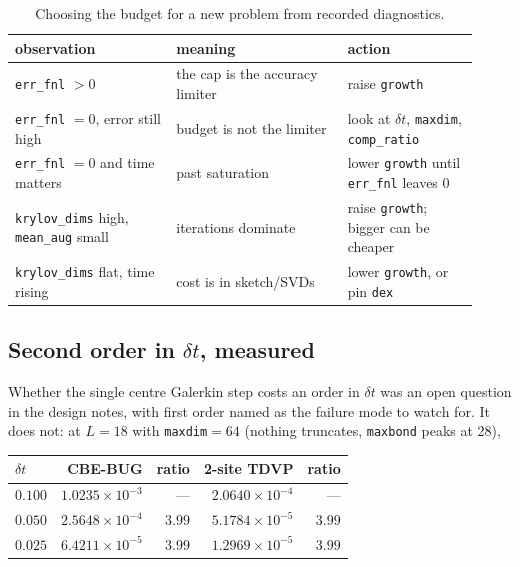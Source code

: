 \documentclass[11pt,a4paper]{article}
\newcommand{\code}[1]{\texttt{\small #1}}
\begin{document}
\begin{table}[t]
\centering
\begin{tabular}{@{}p{0.32\linewidth}p{0.34\linewidth}p{0.26\linewidth}@{}}
\toprule
\textbf{observation} & \textbf{meaning} & \textbf{action} \\
\midrule
\code{err\_fnl} $>0$ & the cap is the accuracy limiter & raise \code{growth} \\
\code{err\_fnl} $=0$, error still high & budget is not the limiter & look at $\delta t$,
\code{maxdim}, \code{comp\_ratio} \\
\code{err\_fnl} $=0$ and time matters & past saturation & lower \code{growth} until
\code{err\_fnl} leaves $0$ \\
\code{krylov\_dims} high, \code{mean\_aug} small & iterations dominate & raise \code{growth};
bigger can be cheaper \\
\code{krylov\_dims} flat, time rising & cost is in sketch/SVDs & lower \code{growth}, or pin
\code{dex} \\
\bottomrule
\end{tabular}
\caption{Choosing the budget for a new problem from recorded diagnostics.}
\label{tab:decide}
\end{table}

\subsection{Second order in \texorpdfstring{$\delta t$}{dt}, measured}

Whether the single centre Galerkin step costs an order in $\delta t$ was an open question in
the design notes, with first order named as the failure mode to watch for. It does not:
at $L=18$ with \code{maxdim}$=64$ (nothing truncates, \code{maxbond} peaks at 28),

\begin{center}
\begin{tabular}{@{}lrrrr@{}}
\toprule
$\delta t$ & CBE-BUG & ratio & 2-site TDVP & ratio \\
\midrule
$0.100$ & $1.0235\times10^{-3}$ & --- & $2.0640\times10^{-4}$ & --- \\
$0.050$ & $2.5648\times10^{-4}$ & $3.99$ & $5.1784\times10^{-5}$ & $3.99$ \\
$0.025$ & $6.4211\times10^{-5}$ & $3.99$ & $1.2969\times10^{-5}$ & $3.99$ \\
\bottomrule
\end{tabular}
\end{center}
\end{document}
